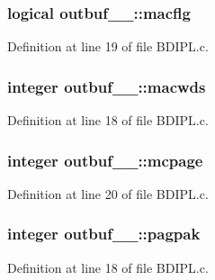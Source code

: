 \subsubsection[{\texorpdfstring{macflg}{macflg}}]{\setlength{\rightskip}{0pt plus 5cm}logical outbuf\+\_\+\_\+\+::macflg}\hypertarget{structoutbuf__1___afc42ddacca1bc9897310c19bd26f7598}{}\label{structoutbuf__1___afc42ddacca1bc9897310c19bd26f7598}


Definition at line 19 of file B\+D\+I\+P\+L.\+c.

\subsubsection[{\texorpdfstring{macwds}{macwds}}]{\setlength{\rightskip}{0pt plus 5cm}integer outbuf\+\_\+\_\+\+::macwds}\hypertarget{structoutbuf__1___a29392e1ee5de156807889372620bf343}{}\label{structoutbuf__1___a29392e1ee5de156807889372620bf343}


Definition at line 18 of file B\+D\+I\+P\+L.\+c.

\subsubsection[{\texorpdfstring{mcpage}{mcpage}}]{\setlength{\rightskip}{0pt plus 5cm}integer outbuf\+\_\+\_\+\+::mcpage}\hypertarget{structoutbuf__1___a8ac9d2549f54bce2332dcbb015884f83}{}\label{structoutbuf__1___a8ac9d2549f54bce2332dcbb015884f83}


Definition at line 20 of file B\+D\+I\+P\+L.\+c.

\subsubsection[{\texorpdfstring{pagpak}{pagpak}}]{\setlength{\rightskip}{0pt plus 5cm}integer outbuf\+\_\+\_\+\+::pagpak}\hypertarget{structoutbuf__1___a0a2950238f2d0e44d082ada3df7243c8}{}\label{structoutbuf__1___a0a2950238f2d0e44d082ada3df7243c8}


Definition at line 18 of file B\+D\+I\+P\+L.\+c.

